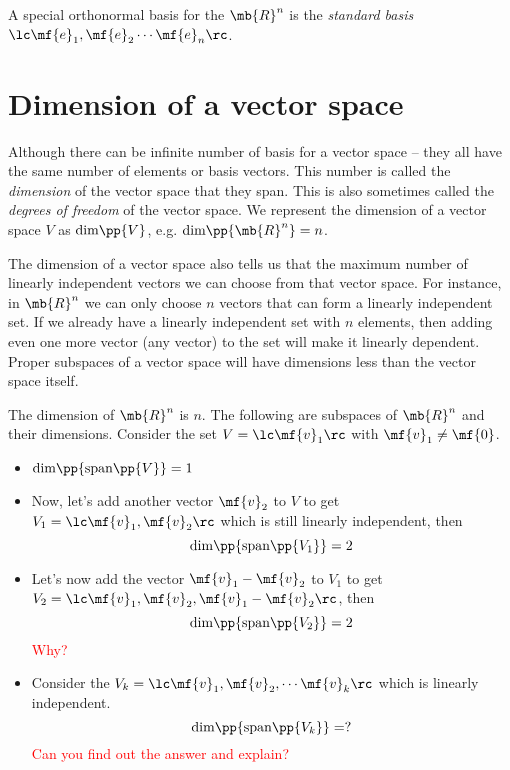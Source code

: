 A special orthonormal basis for the $\mb{R}^n$ is the \textit{standard basis} $\lc \mf{e}_1, \mf{e}_2 \cdots \mf{e}_n\rc$.

\section{Dimension of a vector space}
Although there can be infinite number of basis for a vector space -- they all have the same number of elements or basis vectors. This number is called the \textit{dimension} of the vector space that they span. This is also sometimes called the 
\textit{degrees of freedom} of the vector space. We represent the dimension of a vector space $V$ as $\text{dim}\pp{V}$, e.g. $\text{dim}\pp{\mb{R}^n} = n$.

The dimension of a vector space also tells us that the maximum number of linearly independent vectors we can choose from that vector space. For instance, in $\mb{R}^n$ we can only choose $n$ vectors that can form a linearly independent set. If we already have a linearly independent set with $n$ elements, then adding even one more vector (any vector) to the set will make it linearly dependent. Proper subspaces of a vector space will have dimensions less than the vector space itself.

\begin{boxedstuff}
    \begin{example}
        The dimension of $\mb{R}^n$ is $n$. The following are subspaces of $\mb{R}^n$ and their dimensions. Consider the set $V = \lc \mf{v}_1\rc$ with $\mf{v}_1 \neq \mf{0}$.
        \begin{itemize}
            \item $\text{dim}\pp{\text{span}\pp{V}} = 1$ 
            \item Now, let's add another vector $\mf{v}_2$ to $V$ to get $V_1 = \lc \mf{v}_1, \mf{v}_2 \rc$ which is still linearly independent, then
            \[ \text{dim}\pp{\text{span}\pp{V_1}} = 2 \]
            \item Let's now add the vector $\mf{v}_1 - \mf{v}_2$ to $V_1$ to get $V_2 = \lc \mf{v}_1, \mf{v}_2, \mf{v}_1 - \mf{v}_2 \rc$, then
            \[ \text{dim}\pp{\text{span}\pp{V_2}} = 2 \] \textcolor{red}{Why?}
            \item Consider the $V_k = \lc \mf{v}_1, \mf{v}_2, \cdots \mf{v}_k \rc$ which is linearly independent.
            \[ \text{dim}\pp{\text{span}\pp{V_k}} = ? \] \textcolor{red}{Can you find out the answer and explain?}
        \end{itemize}
    \end{example}
\end{boxedstuff}

